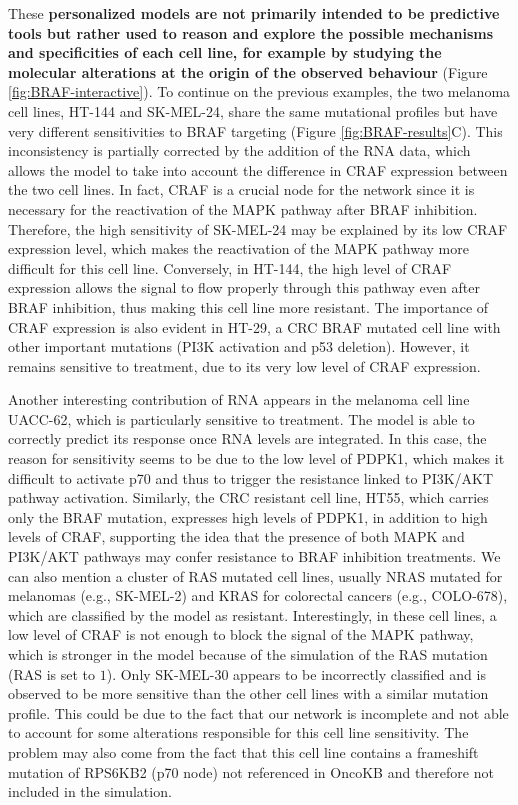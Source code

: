 \documentclass[a4paper,12pt,twoside,onecolumn,openright,final,oldfontcommands]{memoir}
\begin{document}
These \textbf{personalized models are not primarily intended to be
predictive tools but rather used to reason and explore the possible
mechanisms and specificities of each cell line, for example by studying
the molecular alterations at the origin of the observed behaviour}
(Figure \ref{fig:BRAF-interactive}). To continue on the previous
examples, the two melanoma cell lines, HT-144 and SK-MEL-24, share the
same mutational profiles but have very different sensitivities to BRAF
targeting (Figure \ref{fig:BRAF-results}C). This inconsistency is
partially corrected by the addition of the RNA data, which allows the
model to take into account the difference in CRAF expression between the
two cell lines. In fact, CRAF is a crucial node for the network since it
is necessary for the reactivation of the MAPK pathway after BRAF
inhibition. Therefore, the high sensitivity of SK-MEL-24 may be
explained by its low CRAF expression level, which makes the reactivation
of the MAPK pathway more difficult for this cell line. Conversely, in
HT-144, the high level of CRAF expression allows the signal to flow
properly through this pathway even after BRAF inhibition, thus making
this cell line more resistant. The importance of CRAF expression is also
evident in HT-29, a CRC BRAF mutated cell line with other important
mutations (PI3K activation and p53 deletion). However, it remains
sensitive to treatment, due to its very low level of CRAF expression.

Another interesting contribution of RNA appears in the melanoma cell
line UACC-62, which is particularly sensitive to treatment. The model is
able to correctly predict its response once RNA levels are integrated.
In this case, the reason for sensitivity seems to be due to the low
level of PDPK1, which makes it difficult to activate p70 and thus to
trigger the resistance linked to PI3K/AKT pathway activation. Similarly,
the CRC resistant cell line, HT55, which carries only the BRAF mutation,
expresses high levels of PDPK1, in addition to high levels of CRAF,
supporting the idea that the presence of both MAPK and PI3K/AKT pathways
may confer resistance to BRAF inhibition treatments. We can also mention
a cluster of RAS mutated cell lines, usually NRAS mutated for melanomas
(e.g., SK-MEL-2) and KRAS for colorectal cancers (e.g., COLO-678), which
are classified by the model as resistant. Interestingly, in these cell
lines, a low level of CRAF is not enough to block the signal of the MAPK
pathway, which is stronger in the model because of the simulation of the
RAS mutation (RAS is set to \(1\)). Only SK-MEL-30 appears to be
incorrectly classified and is observed to be more sensitive than the
other cell lines with a similar mutation profile. This could be due to
the fact that our network is incomplete and not able to account for some
alterations responsible for this cell line sensitivity. The problem may
also come from the fact that this cell line contains a frameshift
mutation of RPS6KB2 (p70 node) not referenced in OncoKB and therefore
not included in the simulation.
\end{document}

